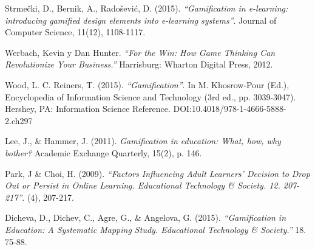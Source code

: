 \begin{thebibliography}{9}
        Strmečki, D., Bernik, A., Radošević, D. (2015).
        {\it ``Gamification in e-learning: introducing gamified design elements into e-learning systems''}.
        Journal of Computer Science, 11(12), 1108-1117.

        Werbach, Kevin y Dan Hunter.
        \textit{``For the Win: How Game Thinking Can Revolutionize Your Business.''}
        Harrisburg: Wharton Digital Press, 2012.

        Wood, L. C. Reiners, T. (2015).
        {\it ``Gamification''}. In M. Khosrow-Pour (Ed.), Encyclopedia of Information Science and Technology (3rd ed., pp. 3039-3047).
        Hershey, PA: Information Science Reference. DOI:10.4018/978-1-4666-5888-2.ch297

        

        
        Lee, J., \& Hammer, J. (2011). 
        \textit{Gamification in education: What, how, why bother?} 
        Academic Exchange Quarterly, 15(2), p. 146.
    
        Park, J \& Choi, H. (2009). {\it ``Factors Influencing Adult Learners' Decision to Drop Out or Persist in Online Learning. Educational Technology \& Society. 12. 207-217''}. (4), 207-217.

        Dicheva, D., Dichev, C., Agre, G., \& Angelova, G. (2015). {\it``Gamification in Education: A Systematic Mapping Study. Educational Technology \& Society.''} 18. 75-88.
        

\end{thebibliography}
